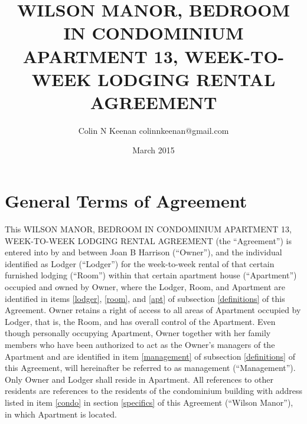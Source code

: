 \documentclass[12pt,letterpaper]{article}
\newcommand{\agreementtitle}{WILSON MANOR, BEDROOM IN CONDOMINIUM APARTMENT 13, WEEK-TO-WEEK LODGING RENTAL AGREEMENT}
\newcommand{\lodger}{Lodger}
\newcommand{\generals}{General Terms of Agreement}
\newcommand{\mom}{Joan B Harrison}
\newcommand{\management}{Management}
\newcommand{\condo}{Wilson Manor}
\newcommand{\apt}{Apartment}
\newcommand{\room}{Room}
\begin{document}
\title{\agreementtitle{}}
\author{Colin N Keenan colinnkeenan@gmail.com}
\date{March 2015}
\maketitle
\thispagestyle{fancy}

\noindent \hrulefill
\section{\generals{}} \label{generals}
This \agreementtitle{} (the ``Agreement'') is entered into by and between \mom{} (``Owner''), and the individual identified as \lodger{} (``\lodger{}'') for the week-to-week rental of that certain furnished lodging (``\room{}'') within that certain apartment house (``\apt{}'') occupied and owned by Owner, where the \lodger{}, \room{}, and \apt{} are identified in items \ref{lodger}, \ref{room}, and \ref{apt} of subsection \ref{definitions} of this Agreement. Owner retains a right of access to all areas of \apt{} occupied by \lodger{}, that is, the \room{}, and has overall control of the \apt{}. Even though personally occupying \apt{}, Owner together with her family members who have been authorized to act as the Owner's managers of the \apt{} and are identified in item \ref{management} of subsection \ref{definitions} of this Agreement, will hereinafter be referred to as management (``\management{}''). Only Owner and \lodger{} shall reside in \apt{}. All references to other residents are references to the residents of the condominium building with address listed in item \ref{condo} in section \ref{specifics} of this Agreement (``\condo{}''), in which \apt{} is located.
\end{document}
